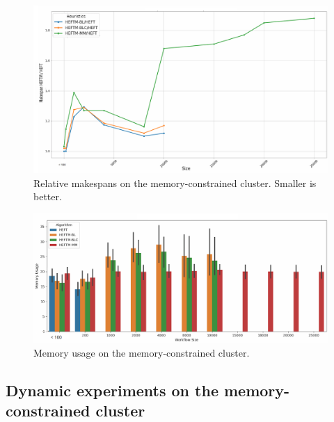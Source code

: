 \documentclass[conference]{IEEEtran}
\begin{document}
\begin{figure}[tb]
    \centering
    \includegraphics[width=1\columnwidth] {images/makespan_relations_by_wf_size-constrained2}
    \caption{Relative makespans on the memory-constrained cluster.
    Smaller is better.}
    \label{fig:ms-relations-by-workflow-constrained}
    \vspace{-0.15cm}
\end{figure}


\begin{figure}[tb]
    \centering
    \includegraphics[width=1\columnwidth] {images/mem-usage-constrained-onlyvalid2}
    \caption{Memory usage on the memory-constrained  cluster. } %
    \label{fig:memory-usage-constrained}
    \vspace{-0.15cm}
\end{figure}


    
\subsection{Dynamic experiments on the memory-constrained cluster}
\label{sec.expe.dyn}
\end{document}

